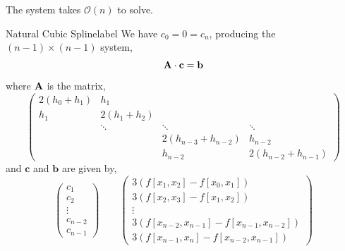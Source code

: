\begin{marginfigure}
    The system takes $\mathcal{O}(n)$ to solve.
\end{marginfigure}

\begin{ex}{Natural Cubic Spline}{label}
    We have $c_0 = 0 = c_n$, producing the $(n - 1) \times (n - 1)$ system,
    \[\mathbf{A} \cdot \mathbf{c} = \mathbf{b}\]
    where $\mathbf{A}$ is the matrix,
    \[
       \left(\begin{array}{cccc}
        2\left(h_0+h_1\right) & h_1 & & \\
        h_1 & 2\left(h_1+h_2\right) & & \\
        & \ddots & \ddots & \ddots \\
        & & 2\left(h_{n-3}+h_{n-2}\right) & h_{n-2} \\
        & & h_{n-2} & 2\left(h_{n-2}+h_{n-1}\right)
        \end{array}\right)
    \]
    and $\mathbf{c}$ and $\mathbf{b}$ are given by,
    \[
    \left(\begin{array}{c}
    c_1 \\
    c_2 \\
    \vdots \\
    c_{n-2} \\
    c_{n-1}
    \end{array}\right) \quad \quad \left(\begin{array}{c}
    3\left(f\left[x_1, x_2\right]-f\left[x_0, x_1\right]\right) \\
    3\left(f\left[x_2, x_3\right]-f\left[x_1, x_2\right]\right) \\
    \vdots \\
    3\left(f\left[x_{n-2}, x_{n-1}\right]-f\left[x_{n-1}, x_{n-2}\right]\right) \\
    3\left(f\left[x_{n-1}, x_n\right]-f\left[x_{n-2}, x_{n-1}\right]\right)
    \end{array}\right)
    \]
\end{ex}


